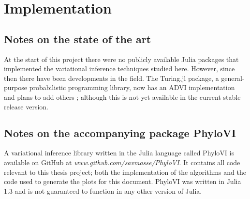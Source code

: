 \chapter{Implementation}

\section{Notes on the state of the art}
At the start of this project there were no publicly available Julia packages that implemented the variational inference techniques studied here. However, since then there have been developments in the field. The Turing.jl package, a general-purpose probabilistic programming library, now has an ADVI implementation and plans to add others \parencite{Turing}; although this is not yet available in the current stable release version.

\section{Notes on the accompanying package PhyloVI}
A variational inference library written in the Julia language called PhyloVI is available on GitHub at \textit{www.github.com/savmasse/PhyloVI}. It contains all code relevant to this thesis project; both the implementation of the algorithms and the code used to generate the plots for this document. PhyloVI was written in Julia 1.3 and is not guaranteed to function in any other version of Julia.